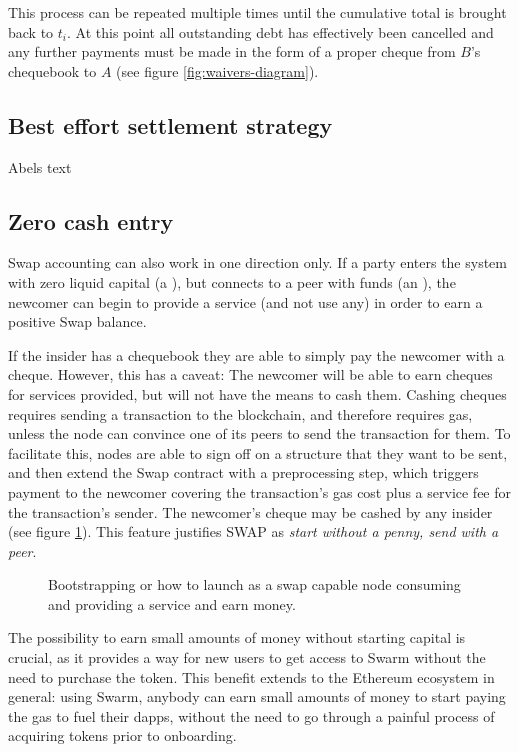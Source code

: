 This process can be repeated multiple times until the cumulative total is brought back to $t_i$. At this point all outstanding debt has effectively been cancelled and any further payments must be made in the form of a proper cheque from $B$'s chequebook to $A$ (see figure \ref{fig:waivers-diagram}).

\subsection{Best effort settlement strategy}

Abels text

\subsection{Zero cash entry\statusgreen}\label{sec:zero-cash-entry}


Swap accounting can also work in one direction only. If a party enters the system with zero liquid capital (a ), but connects to a peer with funds (an ), the newcomer can begin to provide a service (and not use any) in order to earn a positive Swap balance. 

If the insider has a chequebook they are able to simply pay the newcomer with a cheque. However, this has a caveat: The newcomer will be able to earn cheques for services provided, but will not have the means to cash them. Cashing cheques requires sending a transaction to the blockchain, and therefore requires gas, unless the node can convince one of its peers to send the transaction for them. To facilitate this, nodes are able to sign off on a structure that they want to be sent, and then extend the Swap contract with a preprocessing step, which triggers payment to the newcomer covering the transaction’s gas cost plus a service fee for the transaction's sender. The newcomer's cheque may be cashed by any insider (see figure \ref{fig:zero-cash-entry}). This feature justifies SWAP as \emph{start without a penny, send with a peer}.

\begin{figure}[htbp]
\centering

\caption[Zero cash entry \statusorange]{Bootstrapping or how to launch as a swap capable node consuming and providing a
service and earn money.}
\label{fig:zero-cash-entry}
\end{figure}

The possibility to earn small amounts of money without starting capital is crucial, as it provides a way for new users to get access to Swarm without the need to purchase the token. This benefit extends to the Ethereum ecosystem in general: using Swarm, anybody can earn small amounts of money to start paying the gas to fuel their dapps, without the need to go through a painful process of acquiring tokens prior to onboarding. 



